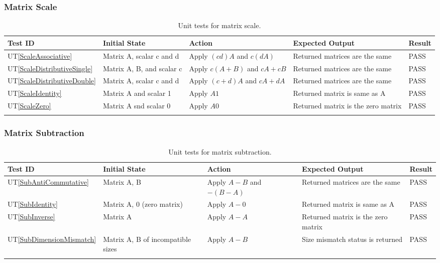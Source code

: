 \documentclass[12pt, titlepage]{article}
\newcommand{\utref}[1]{UT\ref{#1}}
\begin{document}
\subsubsection{Matrix Scale}
{\footnotesize
\begin{longtable}{|p{0.8cm}|p{3.5cm}|p{3.5cm}|p{3.5cm}|p{1cm}|}
    \hline
    \textbf{Test ID} & \textbf{Initial State} & \textbf{Action} &
    \textbf{Expected Output} & \textbf{Result} \\ 
    \endfirsthead
    \hline
    
    \utref{ScaleAssociative} & Matrix A, scalar c and d & Apply $(cd)A$  and
    $c(dA)$ & Returned matrices are the same & PASS\\ \hline
    \utref{ScaleDistributiveSingle} & Matrix A, B, and scalar c & Apply $c(A +
    B)$ and $cA + cB$ & Returned matrices are the same & PASS\\ \hline
    \utref{ScaleDistributiveDouble} & Matrix A, scalar c and d & Apply $(c+d)A$
    and $cA + dA$ & Returned matrices are the same & PASS\\ \hline
    \utref{ScaleIdentity} & Matrix A and scalar 1 & Apply $A1$ & Returned matrix
    is same as A & PASS\\ \hline
    \utref{ScaleZero} & Matrix A snd scalar 0 & Apply $A0$ & Returned matrix is
    the zero matrix & PASS\\ \hline

    \caption{Unit tests for matrix scale.}
    \label{tab:unit_test_matrix_scale}
\end{longtable}
}

\subsubsection{Matrix Subtraction}
{\footnotesize
\begin{longtable}{|p{0.8cm}|p{3.5cm}|p{3.5cm}|p{3.5cm}|p{1cm}|}
    \hline
    \textbf{Test ID} & \textbf{Initial State} & \textbf{Action} &
    \textbf{Expected Output} & \textbf{Result} \\ 
    \endfirsthead
    \hline
    
    \utref{SubAntiCommutative} & Matrix A, B & Apply $A - B$  and $-(B -A)$ &
    Returned matrices are the same & PASS\\ \hline
    \utref{SubIdentity} & Matrix A, 0 (zero matrix) & Apply $A - 0$ & Returned
    matrix is same as A & PASS\\ \hline
    \utref{SubInverse} & Matrix A & Apply $A - A$ & Returned matrix is the zero
    matrix & PASS\\ \hline
    \utref{SubDimensionMismatch} & Matrix A, B of incompatible sizes & Apply $A
    - B$ & Size mismatch status is returned & PASS\\ \hline

    \caption{Unit tests for matrix subtraction.}
    \label{tab:unit_test_matrix_sub}
\end{longtable}
}
\end{document}
